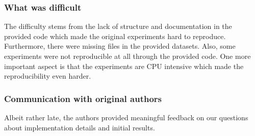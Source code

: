 


\subsubsection*{What was difficult}
The difficulty stems from the lack of structure and documentation in the provided code which made the original experiments hard to reproduce. Furthermore, there were missing files in the provided datasets. Also, some experiments were not reproducible at all through the provided code. One more important aspect is that the experiments are CPU intensive which made the reproducibility even harder. \vspace{-1mm}



\subsubsection*{Communication with original authors}
Albeit rather late, the authors provided meaningful feedback on our questions about implementation details and initial results.